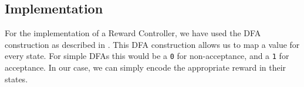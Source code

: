 
\subsection*{Implementation}
For the implementation of a Reward Controller, we have used the DFA construction as described in \cite{g:moore}. This DFA construction allows us to map a value for every state. For simple DFAs this would be a \texttt{0} for non-acceptance, and a \texttt{1} for acceptance. In our case, we can simply encode the appropriate reward in their states. 